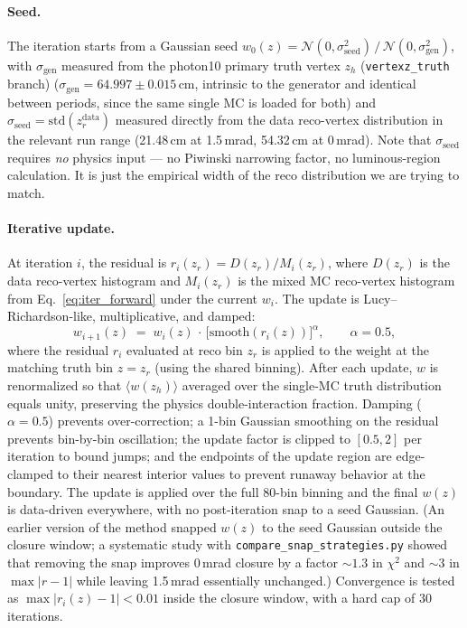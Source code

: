 \documentclass[11pt,a4paper]{article}
\begin{document}
\paragraph{Seed.}
The iteration starts from a Gaussian seed
$w_0(z)\!=\!\mathcal{N}(0, \sigma_\mathrm{seed}^2)\,/\,\mathcal{N}(0, \sigma_\mathrm{gen}^2)$,
with $\sigma_\mathrm{gen}$ measured from the photon10 primary truth vertex
$z_h$ (\texttt{vertexz\_truth} branch) ($\sigma_\mathrm{gen}\!=\!64.997 \pm 0.015$\,cm,
intrinsic to the generator and identical between periods, since the
same single MC is loaded for both) and $\sigma_\mathrm{seed} =
\mathrm{std}(z_r^\mathrm{data})$ measured directly from the data
reco-vertex distribution in the relevant run range (21.48\,cm at
1.5\,mrad, 54.32\,cm at 0\,mrad). Note that $\sigma_\mathrm{seed}$
requires \emph{no} physics input --- no Piwinski narrowing factor, no
luminous-region calculation. It is just the empirical width of the
reco distribution we are trying to match.

\paragraph{Iterative update.}
At iteration $i$, the residual is $r_i(z_r) = D(z_r)/M_i(z_r)$, where
$D(z_r)$ is the data reco-vertex histogram and $M_i(z_r)$ is the mixed
MC reco-vertex histogram
from Eq.~\eqref{eq:iter_forward} under the current $w_i$. The update is
Lucy--Richardson-like, multiplicative, and damped:
\begin{equation}
w_{i+1}(z) \;=\; w_i(z)\,\cdot\,\bigl[\mathrm{smooth}(r_i(z))\bigr]^{\alpha},
\qquad \alpha = 0.5,
\label{eq:iter_update}
\end{equation}
where the residual $r_i$ evaluated at reco bin $z_r$ is applied to the
weight at the matching truth bin $z = z_r$ (using the shared binning).
After each update, $w$ is renormalized so that $\langle w(z_h)\rangle$
averaged over the single-MC truth distribution equals unity, preserving
the physics double-interaction fraction.
Damping ($\alpha\!=\!0.5$) prevents over-correction; a 1-bin Gaussian
smoothing on the residual prevents bin-by-bin oscillation; the update
factor is clipped to $[0.5, 2]$ per iteration to bound jumps; and the
endpoints of the update region are edge-clamped to their nearest
interior values to prevent runaway behavior at the boundary. The
update is applied over the full 80-bin binning and the final
$w(z)$ is data-driven everywhere, with no post-iteration snap to a
seed Gaussian. (An earlier version of the method snapped $w(z)$ to
the seed Gaussian outside the closure window; a systematic study with
\texttt{compare\_snap\_strategies.py} showed that removing the snap
improves 0\,mrad closure by a factor $\sim\!1.3$ in $\chi^2$ and
$\sim\!3$ in $\max|r\!-\!1|$ while leaving 1.5\,mrad essentially
unchanged.) Convergence is tested as
$\max|r_i(z)\!-\!1|\!<\!0.01$ inside the closure window, with a hard
cap of 30 iterations.
\end{document}
